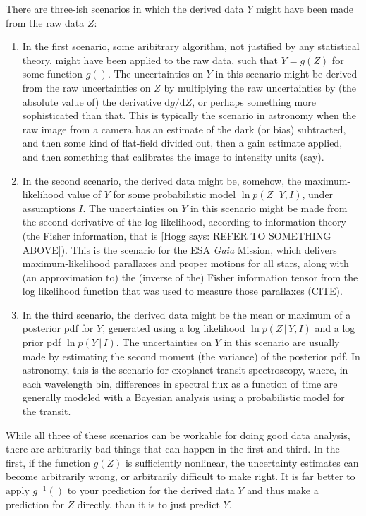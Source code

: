 \documentclass{article}
\newcommand{\dd}{\mathrm{d}}
\newcommand{\given}{\,|\,}
\newcommand{\hogg}[1]{{\color{blue}[Hogg says: {#1}]}}
\begin{document}
There are three-ish scenarios in which the derived data $Y$ might have been made from the raw data $Z$:
\begin{enumerate}
\item In the first scenario, some aribitrary algorithm, not justified by any statistical theory, might have been applied to the raw data, such that $Y=g(Z)$ for some function $g()$.
The uncertainties on $Y$ in this scenario might be derived from the raw uncertainties on $Z$  by multiplying the raw uncertainties by (the absolute value of) the derivative $\dd g/\dd Z$, or perhaps something more sophisticated than that.
This is typically the scenario in astronomy when the raw image from a camera has an estimate of the dark (or bias) subtracted, and then some kind of flat-field divided out, then a gain estimate applied, and then something that calibrates the image to intensity units (say).
\item In the second scenario, the derived data might be, somehow, the maximum-likelihood value of $Y$ for some probabilistic model $\ln p(Z\given Y,I)$, under assumptions $I$.
The uncertainties on $Y$ in this scenario might be made from the second derivative of the log likelihood, according to information theory (the Fisher information, that is \hogg{REFER TO SOMETHING ABOVE}).
This is the scenario for the ESA \textsl{Gaia} Mission, which delivers maximum-likelihood parallaxes and proper motions for all stars, along with (an approximation to) the (inverse of the) Fisher information tensor from the log likelihood function that was used to measure those parallaxes (CITE).
\item In the third scenario, the derived data might be the mean or maximum of a posterior pdf for $Y$, generated using a log likelihood $\ln p(Z\given Y,I)$ and a log prior pdf $\ln p(Y\given I)$.
The uncertainties on $Y$ in this scenario are usually made by estimating the second moment (the variance) of the posterior pdf.
In astronomy, this is the scenario for exoplanet transit spectroscopy, where, in each wavelength bin, differences in spectral flux as a function of time are generally modeled with a Bayesian analysis using a probabilistic model for the transit.
\end{enumerate}
While all three of these scenarios can be workable for doing good data analysis, there are arbitrarily bad things that can happen in the first and third.
In the first, if the function $g(Z)$ is sufficiently nonlinear, the uncertainty estimates can become arbitrarily wrong, or arbitrarily difficult to make right.
It is far better to apply $g^{-1}()$ to your prediction for the derived data $Y$ and thus make a prediction for $Z$ directly, than it is to just predict $Y$.
\end{document}

